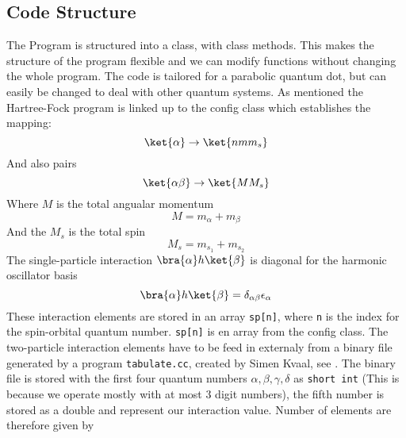 \subsection{Code Structure}
The Program is structured into a class, with class methods. This makes the structure of the program flexible and we can modify functions without changing the whole program. The code is tailored for a parabolic quantum dot, but can easily be changed to deal with other quantum systems. As mentioned the Hartree-Fock program is linked up to the config class which establishes the mapping:
\begin{equation}
  \ket{\alpha} \rightarrow \ket{n m m_s}
\end{equation}
And also pairs 
\begin{equation}
  \ket{\alpha \beta} \rightarrow \ket{M M_s}
\end{equation}
Where $M$ is the total angualar momentum 
\begin{equation}
M = m_\alpha + m_\beta
  \label{totalmomentum}
\end{equation}
And the $M_s$ is the total spin
\begin{equation}
M_s = m_{s_1} + m_{s_2} 
  \label{spin}
\end{equation}
The single-particle interaction $\bra{\alpha}h\ket{\beta}$ is diagonal for the harmonic oscillator basis
\begin{equation}
\bra{\alpha}h\ket{\beta} = \delta_{\alpha \beta} \epsilon_\alpha
\end{equation}
%
These interaction elements are stored in an array \texttt{sp[n]}, where \texttt{n} is the index for the spin-orbital quantum number. \texttt{sp[n]} is en array from the config class. The two-particle interaction elements have to be feed in externaly from a binary file generated by a program \texttt{tabulate.cc}, created by Simen Kvaal, see \cite{Kvaal2009}. The binary file is stored with the first four quantum numbers $\alpha,\beta,\gamma,\delta$ as \texttt{short int} (This is because we operate mostly with at most 3 digit numbers), the fifth number is stored as a double and represent our interaction value. Number of elements are therefore given by 

